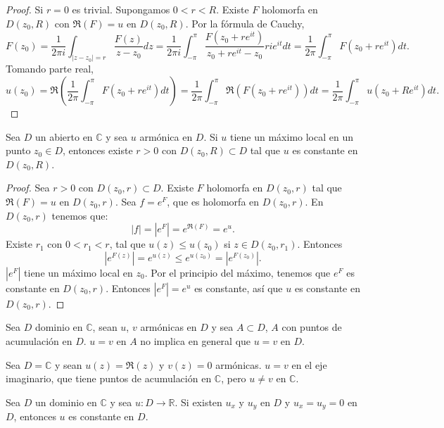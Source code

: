 \begin{proof}
    Si $r = 0$ es trivial.
    Supongamos $0 < r < R$.
    Existe $F$ holomorfa en $D(z_0, R)$ con $\Re(F) = u$ en $D(z_0, R)$.
    Por la fórmula de Cauchy,
    $$F(z_0) = \frac{1}{2\pi i} \int_{|z-z_0|=r} \frac{F(z)}{z-z_0}dz = \frac{1}{2\pi i} \int_{-\pi}^\pi \frac{F(z_0 + re^{it})}{z_0 + re^{it} - z_0}rie^{it}dt = \frac{1}{2\pi} \int_{-\pi}^\pi F(z_0 + re^{it})dt.$$
    Tomando parte real,
    $$u(z_0) = \Re\left(\frac{1}{2\pi} \int_{-\pi}^\pi F(z_0 + re^{it})dt\right) = \frac{1}{2\pi} \int_{-\pi}^\pi \Re(F(z_0 + re^{it}))dt = \frac{1}{2\pi} \int_{-\pi}^\pi u(z_0 + Re^{it})dt.$$
\end{proof}

\begin{theorem}
    Sea $D$ un abierto en $\mathbb{C}$ y sea $u$ armónica en $D$.
    Si $u$ tiene un máximo local en un punto $z_0 \in D$, entonces existe $r > 0$ con $D(z_0, R) \subset D$ tal que $u$ es constante en $D(z_0, R)$.
\end{theorem}

\begin{proof}
    Sea $r > 0$ con $D(z_0, r) \subset D$.
    Existe $F$ holomorfa en $D(z_0, r)$ tal que $\Re(F) = u$ en $D(z_0, r)$.
    Sea $f = e^F$, que es holomorfa en $D(z_0, r)$.
    En $D(z_0, r)$ tenemos que:
    $$|f| = |e^F| = e^{\Re(F)} = e^u.$$
    Existe $r_1$ con $0 < r_1 < r$, tal que $u(z) \leq u(z_0)$ si $z \in D(z_0, r_1)$.
    Entonces
    $$|e^{F(z)}| = e^{u(z)} \leq e^{u(z_0)} = |e^{F(z_0)}|.$$
    $|e^F|$ tiene un máximo local en $z_0$.
    Por el principio del máximo, tenemos que $e^F$ es constante en $D(z_0, r)$.
    Entonces $|e^F| = e^u$ es constante, así que $u$ es constante en $D(z_0, r)$.
\end{proof}

Sea $D$ dominio en $\mathbb{C}$, sean $u$, $v$ armónicas en $D$ y sea $A \subset D$, $A$ con puntos de acumulación en $D$.
$u = v$ en $A$ no implica en general que $u = v$ en $D$.

\begin{example}[Contraejemplo]
    Sea $D = \mathbb{C}$ y sean $u(z) = \Re(z)$ y $v(z) = 0$ armónicas.
    $u = v$ en el eje imaginario, que tiene puntos de acumulación en $\mathbb{C}$, pero $u \neq v$ en $\mathbb{C}$.
\end{example}

\begin{remark}
    Sea $D$ un dominio en $\mathbb{C}$ y sea $u: D \to \mathbb{R}$.
    Si existen $u_x$ y $u_y$ en $D$ y $u_x = u_y = 0$ en $D$, entonces $u$ es constante en $D$.
\end{remark}

